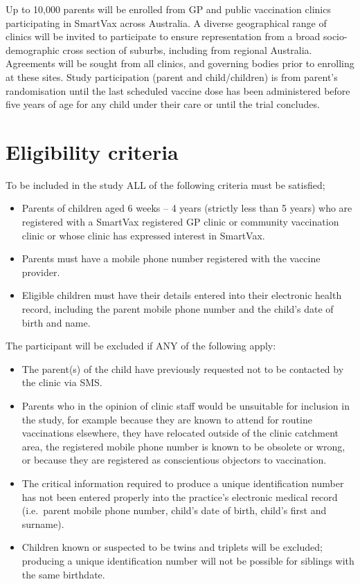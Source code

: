 \documentclass[
  bibliography=totoc]{scrreprt}
\providecommand{\tightlist}{%
  \setlength{\itemsep}{0pt}\setlength{\parskip}{0pt}}
\begin{document}
Up to 10,000 parents will be enrolled from GP and public vaccination clinics participating in SmartVax across Australia.
A diverse geographical range of clinics will be invited to participate to ensure representation from a broad socio-demographic cross section of suburbs, including from regional Australia.
Agreements will be sought from all clinics, and governing bodies prior to enrolling at these sites.
Study participation (parent and child/children) is from parent's randomisation until the last scheduled vaccine dose has been administered before five years of age for any child under their care or until the trial concludes.

\hypertarget{eligibility-criteria}{%
\section{Eligibility criteria}\label{eligibility-criteria}}

To be included in the study ALL of the following criteria must be satisfied;

\begin{itemize}
\tightlist
\item
  Parents of children aged 6 weeks -- 4 years (strictly less than 5 years) who are registered with a SmartVax registered GP clinic or community vaccination clinic or whose clinic has expressed interest in SmartVax.
\item
  Parents must have a mobile phone number registered with the vaccine provider.
\item
  Eligible children must have their details entered into their electronic health record, including the parent mobile phone number and the child's date of birth and name.
\end{itemize}

The participant will be excluded if ANY of the following apply:

\begin{itemize}
\tightlist
\item
  The parent(s) of the child have previously requested not to be contacted by the clinic via SMS.
\item
  Parents who in the opinion of clinic staff would be unsuitable for inclusion in the study, for example because they are known to attend for routine vaccinations elsewhere, they have relocated outside of the clinic catchment area, the registered mobile phone number is known to be obsolete or wrong, or because they are registered as conscientious objectors to vaccination.
\item
  The critical information required to produce a unique identification number has not been entered properly into the practice's electronic medical record (i.e.~parent mobile phone number, child's date of birth, child's first and surname).
\item
  Children known or suspected to be twins and triplets will be excluded; producing a unique identification number will not be possible for siblings with the same birthdate.
\end{itemize}
\end{document}
